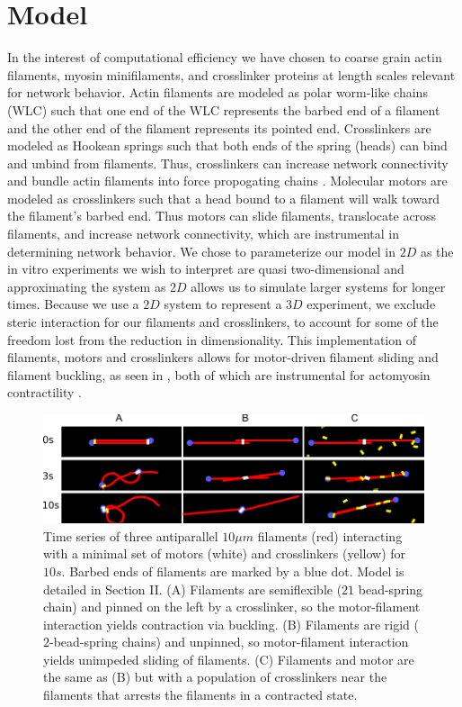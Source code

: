 \documentclass[12pt]{article}
\begin{document}
\section{Model}  
In the interest of computational efficiency we have chosen to coarse grain actin filaments, myosin minifilaments, and
crosslinker proteins at length scales relevant for network behavior. Actin filaments are
modeled as polar worm-like chains (WLC) such that one end of the WLC represents the barbed end of a filament and the
other end of the filament represents its pointed end.  
Crosslinkers are modeled as Hookean springs such
that both ends of the spring (heads) can bind and unbind from filaments. Thus, crosslinkers can increase network connectivity
and bundle actin filaments into force propogating chains \cite{gardel2004, murrell2012, murrell2015, murrell2014, freedman2016}. 
Molecular motors are modeled as crosslinkers such
that a head bound to a filament will walk toward the filament's barbed end. Thus motors can slide filaments,
translocate across filaments, and increase network connectivity, which are instrumental in determining
network behavior\cite{murrell2014}. We chose to parameterize our model in $2D$ as the in vitro experiments we wish to
interpret are quasi two-dimensional \cite{murrellTalk} and
approximating the system as $2D$ allows us to simulate larger systems for longer times. Because we use a $2D$ system to
represent a $3D$ experiment, we exclude steric interaction for our filaments and crosslinkers, to account for
some of the freedom lost from the reduction in dimensionality. This implementation of filaments, motors and crosslinkers allows for 
motor-driven filament sliding and filament buckling, as seen in ,
both of which are instrumental for actomyosin contractility \cite{murrell2012}.
\begin{figure}[H]  
  \centering
  \includegraphics[width=\textwidth]{figs/minimal.pdf}
  \caption{
  \label{fig:toys}%
  Time series of three antiparallel $10\mu m$ filaments (red) interacting with a
  minimal set of motors (white) and crosslinkers (yellow) for $10s$. Barbed ends
  of filaments are marked by a blue dot. Model is detailed in Section II.   
  (A) Filaments are semiflexible ($21$ bead-spring chain) and pinned on the left
  by a crosslinker, so the motor-filament interaction yields contraction via buckling. 
  (B) Filaments are rigid ($2$-bead-spring chains) and unpinned, so 
  motor-filament interaction yields unimpeded sliding of filaments.
  (C) Filaments and motor are the same as (B) but with a population of
crosslinkers near the filaments that arrests the filaments in a contracted state. } 
\end{figure}
\end{document}
